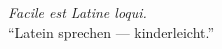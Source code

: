 \vspace{2em}
\begin{center}
\textit{Facile est Latine loqui.} \\
\smallshape ``Latein sprechen — kinderleicht.''
\end{center}
